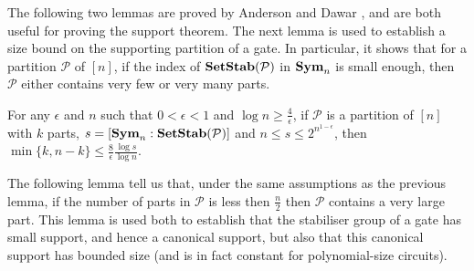 \documentclass[../paper.tex]{subfiles}
\begin{document}




The following two lemmas are proved by Anderson and Dawar \cite{AndersonD17},
and are both useful for proving the support theorem. The next lemma is used to
establish a size bound on the supporting partition of a gate. In
particular, it shows that for a partition $\mathcal{P}$ of $[n]$, if the index
of $\text{\textbf{SetStab}} (\mathcal{P})$ in $\text{\textbf{Sym}}_n$ is small enough, then $\mathcal{P}$
either contains very few or very many parts.

\begin{lem}
  \label{lem:big-or-small}
  For any $\epsilon$ and $n$ such that $0 < \epsilon < 1$ and $\log n \geq
  \frac{4}{\epsilon}$, if $\mathcal{P}$ is a partition of $[n]$ with $k$ parts,
  $s = [\text{\textbf{Sym}}_n : \text{\textbf{SetStab}} (\mathcal{P})]$ and $n \leq s \leq
  2^{n^{1-\epsilon}}$, then $\min \{k, n-k\} \leq \frac{8}{\epsilon} \frac{\log
    s}{\log n}$.
\end{lem}

The following lemma tell us that, under the same assumptions as the previous
lemma, if the number of parts in $\mathcal{P}$ is less then $\frac{n}{2}$ then
$\mathcal{P}$ contains a very large part. This lemma is used both to establish
that the stabiliser group of a gate has small support, and hence a canonical support, but also that
this canonical support has bounded size (and is in fact constant for
polynomial-size circuits).
\end{document}
